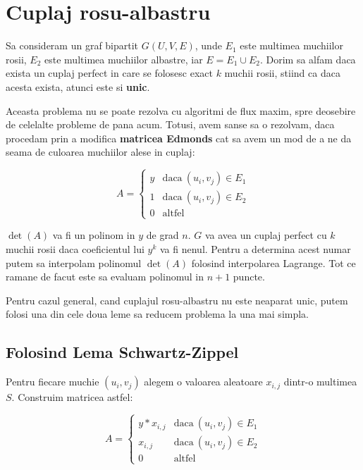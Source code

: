 \pagebreak

\section{Cuplaj rosu-albastru}
\label{redbluematching}

Sa consideram un graf bipartit $G(U, V, E)$, unde $E_{1}$ este multimea
muchiilor rosii, $E_{2}$ este multimea muchiilor albastre, iar
$E = E_{1} \cup E_{2}$. Dorim sa alfam daca exista un cuplaj perfect
in care se folosesc exact $k$ muchii rosii, stiind ca daca acesta exista, atunci
este si \textbf{unic}. \par

Aceasta problema nu se poate rezolva cu algoritmi de flux maxim, spre deosebire
de celelalte probleme de pana acum. Totusi, avem sanse sa o rezolvam, daca
procedam prin a modifica \textbf{matricea Edmonds} cat sa avem un mod de a ne da seama de
culoarea muchiilor alese in cuplaj:

\begin{equation}
  A=
  \begin{cases}
    y & \text{daca}\ (u_{i}, v_{j}) \in E_{1} \\
    1 & \text{daca}\ (u_{i}, v_{j}) \in E_{2} \\
    0 & \text{altfel}
  \end{cases}
\end{equation}

$\det(A)$ va fi un polinom in $y$ de grad $n$. $G$ va avea un cuplaj perfect cu
$k$ muchii rosii daca coeficientul lui $y^{k}$ va fi nenul. Pentru a determina
acest numar putem sa interpolam polinomul $\det(A)$ folosind interpolarea
Lagrange. Tot ce ramane de facut este sa evaluam polinomul in $n+1$ puncte. \par

Pentru cazul general, cand cuplajul rosu-albastru nu este neaparat unic, putem
folosi una din cele doua leme sa reducem problema la una mai simpla.

\subsection{Folosind Lema Schwartz-Zippel}

Pentru fiecare muchie $(u_{i}, v_{j})$ alegem o valoarea aleatoare $x_{i,j}$ dintr-o
multimea $S$. Construim matricea astfel:

\begin{equation}
  A=
  \begin{cases}
    y * x_{i,j} & \text{daca}\ (u_{i}, v_{j}) \in E_{1} \\
    x_{i,j} & \text{daca}\ (u_{i}, v_{j}) \in E_{2} \\
    0 & \text{altfel}
  \end{cases}
\end{equation}


